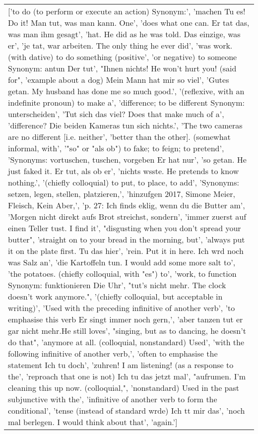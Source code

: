 \documentclass[a4paper,backgrid,frontgrid]{flacards}
\begin{document}
{\begin{tabular}{l}
\parbox[t][][t]{8cm}{\normalfont \small ['to do (to perform or execute an action) Synonym:', 'machen Tu es!  Do it! Man tut, was man kann.  One', 'does what one can. Er tat das, was man ihm gesagt', 'hat.  He did as he was told. Das einzige, was er', 'je tat, war arbeiten.  The only thing he ever did', 'was work. (with dative) to do something (positive', 'or negative) to someone Synonym: antun Der tut', "Ihnen nichts!  He won't hurt you! (said for", 'example about a dog) Mein Mann hat mir so viel', 'Gutes getan.  My husband has done me so much good.', '(reflexive, with an indefinite pronoun) to make a', 'difference; to be different Synonym: unterscheiden', 'Tut sich das viel?  Does that make much of a', 'difference? Die beiden Kameras tun sich nichts.', 'The two cameras are no different [i.e. neither', 'better than the other]. (somewhat  informal, with', '"so" or "als ob") to fake; to feign; to pretend', 'Synonyms: vortuschen, tuschen, vorgeben Er hat nur', 'so getan.  He just faked it. Er tut, als ob er', 'nichts wsste.  He pretends to know nothing.', '(chiefly colloquial) to put, to place, to add', 'Synonyms: setzen, legen, stellen, platzieren,', 'hinzufgen 2017, Simone Meier, Fleisch, Kein  Aber,', 'p. 27: Ich finds eklig, wenn du die Butter am', 'Morgen nicht direkt aufs Brot streichst, sondern', 'immer zuerst auf einen Teller tust. I find it', "disgusting when you don't spread your butter", 'straight on to your bread in the morning, but', 'always put it on the plate first. Tu das hier', 'rein.  Put it in here. Ich wrd noch was Salz an', 'die Kartoffeln tun.  I would add some more salt to', 'the potatoes. (chiefly colloquial, with "es") to', 'work, to function Synonym: funktionieren Die Uhr', "tut's nicht mehr.  The clock doesn't work anymore.", '(chiefly colloquial, but acceptable in writing)', 'Used with the preceding infinitive of another verb', 'to emphasise this verb Er singt immer noch gern,', 'aber tanzen tut er gar nicht mehr.He still loves', "singing, but as to dancing, he doesn't do that", 'anymore at all. (colloquial, nonstandard) Used', 'with the following infinitive of another verb,', 'often to emphasise the statement Ich tu doch', 'zuhren!  I am listening! (as a response to the', 'reproach that one is not) Ich tu das jetzt mal', "aufrumen.  I'm cleaning this up now. (colloquial,", 'nonstandard) Used in the past subjunctive with the', 'infinitive of another verb to form the conditional', 'tense (instead of standard wrde) Ich tt mir das', 'noch mal berlegen.  I would think about that', 'again.'] }\\
\end{tabular}
}
\end{document}
